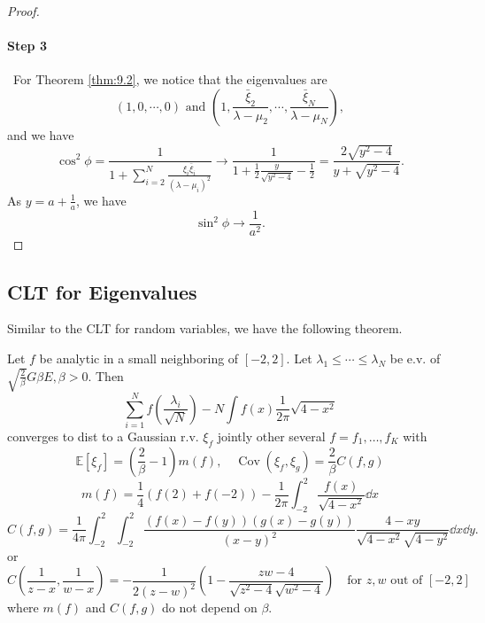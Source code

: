 \begin{proof}
    \paragraph{Step 3} \ For Theorem \ref{thm:9.2}, we notice that the eigenvalues are
    \[
    (1,0,\cdots,0) \text{ and } \left(1, \frac{\bar{\xi}_2}{\lambda-\mu_2},\cdots,\frac{\bar{\xi}_N}{\lambda-\mu_N}
    \right),
    \]
    and we have
    \[
    \cos^2 \phi = \frac{1}{1+\sum_{i=2}^N\frac{\xi_i\bar{\xi}_i}{(\lambda-\mu_i)^2}} \to \frac{1}{1+\frac{1}{2}\frac{y}{\sqrt{y^2-4}}-\frac{1}{2}} = \frac{2\sqrt{y^2-4}}{y+\sqrt{y^2-4}}.
    \]
    As $y = a+\frac{1}{a}$, we have
    \[
    \sin^2 \phi \to \frac{1}{a^2}.
    \]
\end{proof}

\subsection{CLT for Eigenvalues}
Similar to the CLT for random variables, we have the following theorem.
\begin{thm}
\label{RMT_CLT}
Let $f$ be analytic in a small neighboring of $[-2,2]$. Let $\lambda_1\le\cdots\le\lambda_N$ be e.v. of $\sqrt{\frac{2}{\beta}}G\beta E,\beta>0$. Then
\[
\sum_{i=1}^N f\left(\frac{\lambda_i}{\sqrt{N}}\right)-N\int f(x)\frac{1}{2\pi}\sqrt{4-x^2}
\]
converges to dist to a Gaussian r.v. $\xi_f$ jointly other several $f=f_1,\dots,f_K$ with
\[
\mathbb{E}[\xi_f]=\left(\frac{2}{\beta}-1\right)m(f),\quad \operatorname{Cov}(\xi_f,\xi_g)=\frac{2}{\beta}C(f,g)
\]
\[
m(f)=\frac{1}{4}(f(2)+f(-2))-\frac{1}{2\pi}\int_{-2}^2
\frac{f(x)}{\sqrt{4-x^2}}\dd x
\]
\[
C(f,g) = \frac{1}{4\pi} \int_{-2}^2 \int_{-2}^2 \frac{(f(x)-f(y))(g(x)-g(y))}{(x-y)^2}\frac{4-xy}{\sqrt{4-x^2}\sqrt{4-y^2}}\dd x\dd y.
\]
or
\[
C\left(\frac{1}{z-x},\frac{1}{w-x}\right)=-\frac{1}{2(z-w)^2}\left(1-\frac{zw-4}{\sqrt{z^2-4}\sqrt{w^2-4}}\right)
\quad \text{for $z,w$ out of }[-2,2]
\]
where $m(f)$ and $C(f,g)$ do not depend on $\beta$.
\end{thm}

